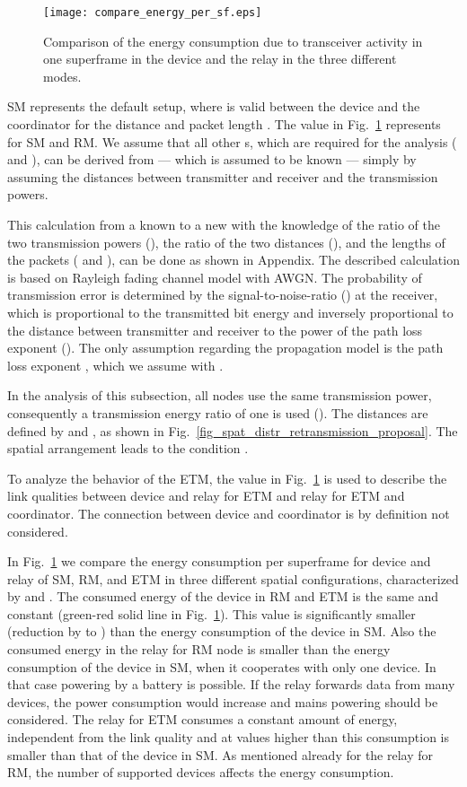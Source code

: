 \documentclass[times,10pt,twocolumn]{article}
\begin{document}
\begin{figure}[!h]
\centering
\texttt{[image: compare\_energy\_per\_sf.eps]}
\caption{Comparison of the energy consumption due to transceiver activity in one superframe in the device and the relay in the three different modes.}
    \label{fig_compare_energy_per_sf}
\end{figure}


SM represents the default setup, where  is valid between the device and the coordinator for the distance  and packet length . The value  in Fig.~\ref{fig_compare_energy_per_sf} represents  for SM and RM.
We assume that all other s, which are required for the analysis ( and ), can be derived from  --- which is assumed to be known --- simply by assuming the distances between transmitter and receiver and the transmission powers.

This calculation from a known  to a new  with the knowledge of the ratio of the two transmission powers (), the ratio of the two distances (), and the lengths of the packets ( and ), can be done as shown in Appendix. The described calculation is based on Rayleigh fading channel model with AWGN. The probability of transmission error is determined by the signal-to-noise-ratio () at the receiver, which is proportional to the transmitted bit energy and inversely proportional to the distance between transmitter and receiver to the power of the path loss exponent (). The only assumption regarding the propagation model is the path loss exponent , which we assume with .

In the analysis of this subsection, all nodes use the same transmission power, consequently a transmission energy ratio of one is used (). The distances are defined by  and , as shown in Fig.~\ref{fig_spat_distr_retransmission_proposal}. The spatial arrangement leads to the condition .

To analyze the behavior of the ETM, the value  in Fig.~\ref{fig_compare_energy_per_sf} is used to describe the link qualities between device and relay for ETM and relay for ETM and coordinator. The connection between device and coordinator is by definition not considered.

In Fig.~\ref{fig_compare_energy_per_sf} we compare the energy consumption per superframe for device and relay of SM, RM, and ETM in three different spatial configurations, characterized by  and . The consumed energy of the device in RM and ETM is the same and constant (green-red solid line in Fig.~\ref{fig_compare_energy_per_sf}). This value is significantly smaller (reduction by  to ) than the energy consumption of the device in SM. Also the consumed energy in the relay for RM node is smaller than the energy consumption of the device in SM, when it cooperates with only one device. In that case powering by a battery is possible. If the relay forwards data from many devices, the power consumption would increase and mains powering should be considered.
The relay for ETM consumes a constant amount of energy, independent from the link quality and at  values higher than  this consumption is smaller than that of the device in SM. As mentioned already for the relay for RM, the number of supported devices affects the energy consumption.
\end{document}

